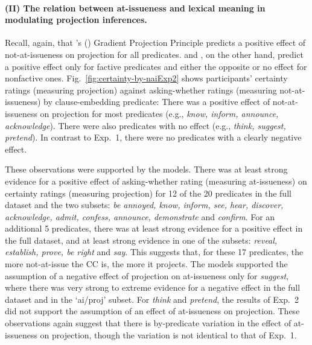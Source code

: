 \documentclass[11pt,fleqn]{article}
\newcommand{\6}{\mbox{$[\hspace*{-.6mm}[$}}
\newcommand{\9}{\mbox{$]\hspace*{-.6mm}]$}}
\newcommand{\citetpos}[1]{\citeauthor{#1}'s (\citeyear{#1})}
\begin{document}
\paragraph{(II) The relation between at-issueness and lexical meaning in modulating projection inferences.}  Recall, again, that \citetpos{tbd-variability} Gradient Projection Principle predicts a positive effect of not-at-issueness on projection for all predicates. \cite{djaerv-bacovcin-salt27,djaerv-bacovcin2020} and \cite{mahler-etal2020}, on the other hand, predict a positive effect only for factive predicates and either the opposite or no effect for nonfactive ones. Fig.~\ref{fig:certainty-by-naiExp2} shows participants' certainty ratings (measuring projection) against asking-whether ratings (measuring not-at-issueness) by clause-embedding predicate: There was a positive effect of not-at-issueness on projection for most predicates (e.g., {\em know, inform, announce, acknowledge}). There were also predicates with no effect (e.g., {\em think, suggest, pretend}). In contrast to Exp.~1, there were no predicates with a clearly negative effect. 

These observations were supported by the models. There was at least strong evidence for a positive effect of asking-whether rating (measuring at-issueness) on certainty ratings (measuring projection) for 12 of the 20 predicates in the full dataset and the two subsets: {\em be annoyed, know, inform, see, hear, discover, acknowledge, admit, confess, announce, demonstrate} and {\em confirm}. For an additional 5 predicates, there was at least strong evidence for a positive effect in the full dataset, and at least strong evidence in one of the subsets:  {\em reveal, establish, prove, be right} and {\em say}. This suggests that, for these 17 predicates, the more not-at-issue the CC is, the more it projects. The models supported the assumption of a negative effect of projection on at-issueness only for {\em suggest}, where there was very strong to extreme evidence for a negative effect in the full dataset and in the `ai/proj' subset. For {\em think} and {\em pretend}, the results of Exp.~2 did not support the assumption of an effect of at-issueness on projection. These observations again suggest that there is by-predicate variation in the effect of at-issueness on projection, though the variation is not identical to that of Exp.~1. 
\end{document}
